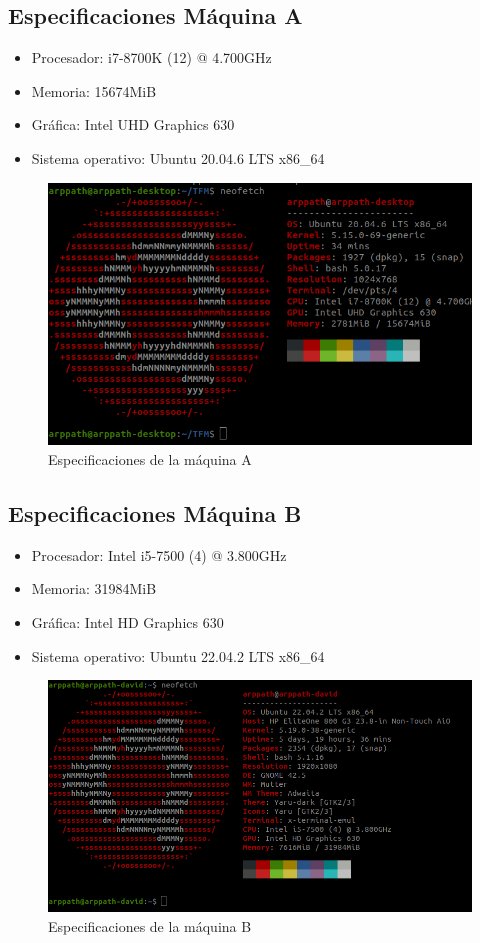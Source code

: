 \subsection{Especificaciones Máquina A}
\label{maquina_A}
\begin{itemize}
    \item Procesador: i7-8700K (12) @ 4.700GHz
    \item Memoria: 15674MiB
    \item Gráfica: Intel UHD Graphics 630
    \item Sistema operativo: Ubuntu 20.04.6 LTS x86\_64
\end{itemize}
\begin{figure}[ht!]
    \centering
    \includegraphics[width=12cm]{archivos/img/anexos/maquinaA.png}
    \caption{Especificaciones de la máquina A}
    \label{fig:maquinaA}
\end{figure}


\subsection{Especificaciones Máquina B}
\label{maquina_B}
\begin{itemize}
    \item Procesador: Intel i5-7500 (4) @ 3.800GHz
    \item Memoria: 31984MiB
    \item Gráfica: Intel HD Graphics 630
    \item Sistema operativo: Ubuntu 22.04.2 LTS x86\_64
\end{itemize}
\begin{figure}[ht!]
    \centering
    \includegraphics[width=12cm]{archivos/img/anexos/maquinaB.png}
    \caption{Especificaciones de la máquina B}
    \label{fig:maquinaB}
\end{figure}


